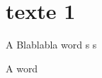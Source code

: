 \documentclass{scrbook}
\begin{document}
\section{texte 1}
\beginnumbering
\pstart
A  Blablabla  word
\pend
\endnumbering
s
s

\beginnumbering
\pstart
A  word
\pend
\endnumbering
\end{document}
